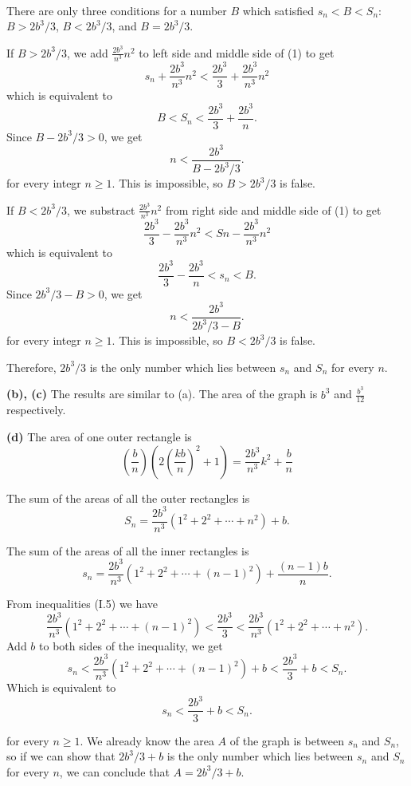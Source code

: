 \begin{solution}{\ \\}
  There are only three conditions for a number $B$ which satisfied $s_n < B < S_n$: $B > 2b^3/3$, $B < 2b^3/3$, and $B = 2b^3/3$.

  If $B > 2b^3/3$, we add $\frac{2b^3}{n^3}n^2$ to left side and middle side of (1) to get
  \[
  s_n + \frac{2b^3}{n^3}n^2 < \frac{2b^3}{3} + \frac{2b^3}{n^3}n^2
  \]
  which is equivalent to
  \[
  B < S_n < \frac{2b^3}{3} + \frac{2b^3}{n}.
  \]
  Since $B - 2b^3/3 > 0$, we get
  \[
  n < \frac{2b^3}{B - 2b^3/3}.
  \]
  for every integr $n \ge 1$. This is impossible, so $B > 2b^3/3$ is false.

  If $B < 2b^3/3$, we substract $\frac{2b^3}{n^3}n^2$ from right side and middle side of (1) to get
  \[
  \frac{2b^3}{3} - \frac{2b^3}{n^3}n^2 < Sn - \frac{2b^3}{n^3}n^2
  \]
  which is equivalent to
  \[
  \frac{2b^3}{3} - \frac{2b^3}{n} < s_n < B.
  \]
  Since $2b^3/3 - B > 0$, we get
  \[
  n < \frac{2b^3}{2b^3/3 - B}.
  \]
  for every integr $n \ge 1$. This is impossible, so $B < 2b^3/3$ is false.

  Therefore, $2b^3/3$ is the only number which lies between $s_n$ and $S_n$ for every $n$.

  \vspace{2\baselineskip}
  \textbf{(b), (c)} The results are similar to (a). The area of the graph is $b^3$ and $\frac{b^3}{12}$ respectively.

  \vspace{2\baselineskip}
  \textbf{(d)} The area of one outer rectangle is
  \[
  \left( \frac{b}{n} \right) \left( 2 \left( \frac{kb}{n} \right)^2 + 1 \right) = \frac{2b^3}{n^3}k^2 + \frac{b}{n}
  \]

  The sum of the areas of all the outer rectangles is
  \[
    S_n = \frac{2b^3}{n^3} \left( 1^2 + 2^2 + \cdots + n^2 \right) + b.
  \]

  The sum of the areas of all the inner rectangles is
  \[
    s_n = \frac{2b^3}{n^3} \left( 1^2 + 2^2 + \cdots + (n-1)^2 \right) + \frac{(n-1)b}{n}.
  \]

  From inequalities (I.5) we have
  \[
  \frac{2b^3}{n^3} \left(1^2 + 2^2 + \cdots + (n-1)^2 \right) < \frac{2b^3}{3} < \frac{2b^3}{n^3} \left( 1^2 + 2^2 + \cdots + n^2 \right).
  \]
  Add $b$ to both sides of the inequality, we get
  \[
  s_n < \frac{2b^3}{n^3}\left( 1^2 + 2^2 + \cdots + (n-1)^2 \right) + b < \frac{2b^3}{3} + b < S_n.
  \]
  Which is equivalent to
  \[
  s_n < \frac{2b^3}{3} + b < S_n. \tag{2}
  \]

  for every $n \ge 1$. We already know the area $A$ of the graph is between $s_n$ and $S_n$, so if we can 
  show that $2b^3/3 + b$ is the only number which lies between $s_n$ and $S_n$ for every $n$, we can conclude that $A = 2b^3/3 + b$.


\end{solution}
